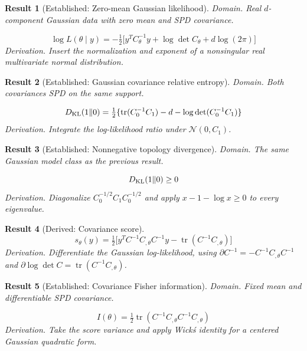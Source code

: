 \documentclass[aps,prd,onecolumn,notitlepage,groupedaddress,11pt]{revtex4-2}
\newtheorem{result}{Result}
\begin{document}
\begin{result}[\textsf{Established}: Zero-mean Gaussian likelihood]\label{res:26}
\textit{Domain.} Real $d$-component Gaussian data with zero mean and SPD covariance.\par
\begin{equation}\label{eq:26}
\log L(\theta\mid y)=-\tfrac12\big[y^TC_\theta^{-1}y+\log\det C_\theta+d\log(2\pi)\big]
\end{equation}
\textit{Derivation.} Insert the normalization and exponent of a nonsingular real multivariate normal distribution.
\end{result}

\begin{result}[\textsf{Established}: Gaussian covariance relative entropy]\label{res:27}
\textit{Domain.} Both covariances SPD on the same support.\par
\begin{equation}\label{eq:27}
D_{\rm KL}(1\Vert0)=\tfrac12\{\operatorname{tr}(C_0^{-1}C_1)-d-\log\det(C_0^{-1}C_1)\}
\end{equation}
\textit{Derivation.} Integrate the log-likelihood ratio under $\mathcal N(0,C_1)$.
\end{result}

\begin{result}[\textsf{Established}: Nonnegative topology divergence]\label{res:28}
\textit{Domain.} The same Gaussian model class as the previous result.\par
\begin{equation}\label{eq:28}
D_{\rm KL}(1\Vert0)\ge0
\end{equation}
\textit{Derivation.} Diagonalize $C_0^{-1/2}C_1C_0^{-1/2}$ and apply $x-1-\log x\ge0$ to every eigenvalue.
\end{result}

\begin{result}[\textsf{Derived}: Covariance score]\label{res:29}
\begin{equation}\label{eq:29}
s_\theta(y)=\tfrac12\big[y^TC^{-1}C_{,\theta}C^{-1}y-\operatorname{tr}(C^{-1}C_{,\theta})\big]
\end{equation}
\textit{Derivation.} Differentiate the Gaussian log-likelihood, using $\partial C^{-1}=-C^{-1}C_{,\theta}C^{-1}$ and $\partial\log\det C=\operatorname{tr}(C^{-1}C_{,\theta})$.
\end{result}

\begin{result}[\textsf{Established}: Covariance Fisher information]\label{res:30}
\textit{Domain.} Fixed mean and differentiable SPD covariance.\par
\begin{equation}\label{eq:30}
I(\theta)=\tfrac12\operatorname{tr}(C^{-1}C_{,\theta}C^{-1}C_{,\theta})
\end{equation}
\textit{Derivation.} Take the score variance and apply Wick\'s identity for a centered Gaussian quadratic form.
\end{result}
\end{document}

